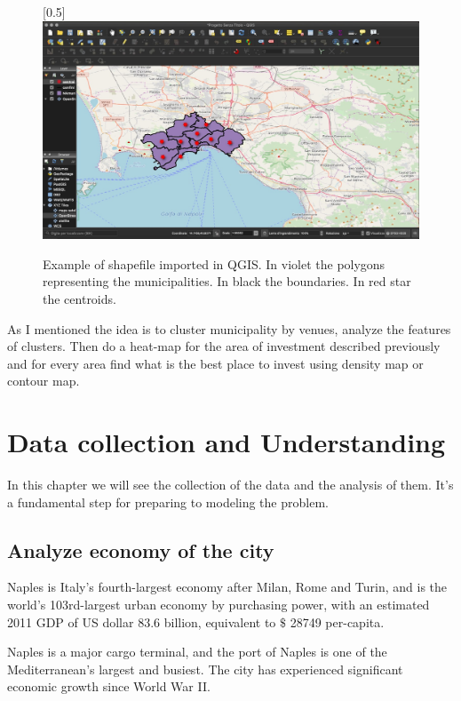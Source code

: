 \documentclass[a4paper, 12pt, oneside]{book}
\begin{document}
\begin{figure}[!htb]
		\centering
		\scalebox{0.3}[0.5]{\includegraphics{immagini/qgis_boundaries.jpg}}
		\caption{Example of shapefile imported in QGIS. In violet the polygons representing the municipalities. In black the boundaries. In red star the centroids. }
		\label{fig:qgis_boundaries}
	\end{figure}



 As I mentioned the idea is to cluster municipality by venues, analyze the features of clusters. Then do a heat-map for the area of investment described previously and for every area find what is the best place to invest using density map or contour map.



\chapter*{Data collection and Understanding}
\label{ch:dataCollection}
In this chapter we will see the collection of the data and the analysis of them. It's a fundamental step for preparing to modeling the problem. 

\section*{Analyze economy of the city} 
\label{sec:economy_city}
Naples is Italy's fourth-largest economy after Milan, Rome and Turin, and is the world's 103rd-largest urban economy by purchasing power, with an estimated 2011 GDP of US dollar 83.6 billion, equivalent to $\$$ 28749 per-capita. 

Naples is a major cargo terminal, and the port of Naples is one of the Mediterranean's largest and busiest. The city has experienced significant economic growth since World War II.
\end{document}
